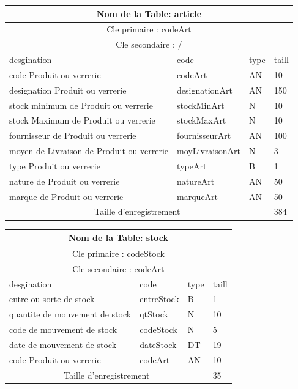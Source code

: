 \vspace{2cm}

\begin{tabular}{ |p{5cm}||p{4cm}|p{3cm}|p{3cm}|  }
    \hline
    \multicolumn{4}{|c|}{Nom de la Table: article} \\
    \hline
    \multicolumn{4}{|c|}{Cle primaire : codeArt} \\
    \hline
    \multicolumn{4}{|c|}{Cle secondaire : / } \\
    \hline
    \hline
    desgination&code&type&taill \\
    \hline
    code Produit ou verrerie&codeArt&AN&10 \\
    designation Produit ou verrerie&designationArt&AN&150 \\
    stock minimum de Produit ou verrerie&stockMinArt&N&10 \\
    stock Maximum de Produit ou verrerie&stockMaxArt&N&10 \\
    fournisseur de Produit ou verrerie&fournisseurArt&AN&100 \\
    moyen de Livraison de Produit ou verrerie&moyLivraisonArt&N&3 \\
    type Produit ou verrerie&typeArt&B&1 \\
    nature de Produit ou verrerie&natureArt&AN&50 \\
    marque de Produit ou verrerie&marqueArt&AN&50 \\
    \hline
    \hline
    \multicolumn{3}{|c|}{Taille d’enregistrement} & 384\\
    \hline
\end{tabular}

\vspace{2cm}

\begin{tabular}{ |p{5cm}||p{4cm}|p{3cm}|p{3cm}|  }
    \hline
    \multicolumn{4}{|c|}{Nom de la Table: stock} \\
    \hline
    \multicolumn{4}{|c|}{Cle primaire : codeStock} \\
    \hline
    \multicolumn{4}{|c|}{Cle secondaire :  codeArt} \\
    \hline
    \hline
    desgination&code&type&taill \\
    \hline
    entre ou sorte de stock&entreStock&B&1 \\
    quantite de mouvement de stock&qtStock&N&10 \\
    code de mouvement de stock&codeStock&N&5 \\
    date de mouvement de stock&dateStock&DT&19 \\
    code Produit ou verrerie&codeArt&AN&10 \\
    \hline
    \hline
    \multicolumn{3}{|c|}{Taille d’enregistrement} & 35\\
    \hline
\end{tabular}

